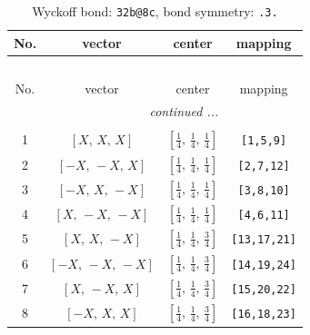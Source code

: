 \documentclass[fleqn,8pt]{jsarticle}
\begin{document}
\renewcommand{\arraystretch}{1.2}
\begin{longtable}{cccc}
\caption{Wyckoff bond: {\tt 32b@8c}, bond symmetry: {\tt .3.}}
 \\
 \hline \hline
No. & vector & center & mapping \\ \hline \endfirsthead

\multicolumn{3}{l}{\tablename\ \thetable{}} \\
 \hline \hline
No. & vector & center & mapping \\ \hline \endhead

 \hline \hline
\multicolumn{3}{r}{\footnotesize\it continued ...} \\ \endfoot

 \hline \hline
\multicolumn{3}{r}{} \\ \endlastfoot

1 & $\left[ X,\, X,\, X \right]$ & $\left[ \frac{1}{4},\, \frac{1}{4},\, \frac{1}{4} \right]$ & {\tt [1,5,9]} \\ \hline
2 & $\left[ - X,\, - X,\, X \right]$ & $\left[ \frac{1}{4},\, \frac{1}{4},\, \frac{1}{4} \right]$ & {\tt [2,7,12]} \\ \hline
3 & $\left[ - X,\, X,\, - X \right]$ & $\left[ \frac{1}{4},\, \frac{1}{4},\, \frac{1}{4} \right]$ & {\tt [3,8,10]} \\ \hline
4 & $\left[ X,\, - X,\, - X \right]$ & $\left[ \frac{1}{4},\, \frac{1}{4},\, \frac{1}{4} \right]$ & {\tt [4,6,11]} \\ \hline
5 & $\left[ X,\, X,\, - X \right]$ & $\left[ \frac{1}{4},\, \frac{1}{4},\, \frac{3}{4} \right]$ & {\tt [13,17,21]} \\ \hline
6 & $\left[ - X,\, - X,\, - X \right]$ & $\left[ \frac{1}{4},\, \frac{1}{4},\, \frac{3}{4} \right]$ & {\tt [14,19,24]} \\ \hline
7 & $\left[ X,\, - X,\, X \right]$ & $\left[ \frac{1}{4},\, \frac{1}{4},\, \frac{3}{4} \right]$ & {\tt [15,20,22]} \\ \hline
8 & $\left[ - X,\, X,\, X \right]$ & $\left[ \frac{1}{4},\, \frac{1}{4},\, \frac{3}{4} \right]$ & {\tt [16,18,23]} \\
\end{longtable}
\renewcommand{\arraystretch}{1.2}
\end{document}
